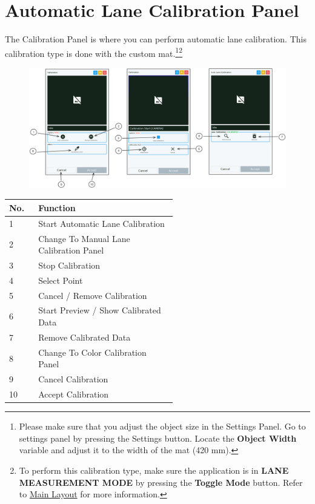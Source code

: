 \pagebreak
\section{Automatic Lane Calibration Panel}
\label{sec:auto-lane-calibration-panel}

The Calibration Panel is where you can perform automatic lane calibration. This calibration type is done with the custom mat.\footnote{Please make sure that you adjust the object size in the Settings Panel. Go to settings panel by pressing the Settings button. Locate the \textbf{Object Width} variable and adjust it to the width of the mat (420 mm).}\footnote{To perform this calibration type, make sure the application is in \textbf{LANE MEASUREMENT MODE} by pressing the \textbf{Toggle Mode} button. Refer to \hyperref[sec:main-layout]{Main Layout} for more information.}

\begin{figure}[H]
    \centering
    \includegraphics[width=\textwidth]{texs/chapter1/image/p2.png}
\end{figure}

\begin{table}[!ht]
    \centering
    \begin{tabular}{p{0.05\linewidth} | p{0.5\linewidth}}
        \hline
        \textbf{No.} & \textbf{Function}                       \\ \hline
        1            & Start Automatic Lane Calibration        \\ \hline
        2            & Change To Manual Lane Calibration Panel \\ \hline
        3            & Stop Calibration                        \\ \hline
        4            & Select Point                            \\ \hline
        5            & Cancel / Remove Calibration             \\ \hline
        6            & Start Preview / Show Calibrated Data    \\ \hline
        7            & Remove Calibrated Data                  \\ \hline
        8            & Change To Color Calibration Panel       \\ \hline
        9            & Cancel Calibration                      \\ \hline
        10           & Accept Calibration                      \\ \hline
    \end{tabular}
\end{table}

